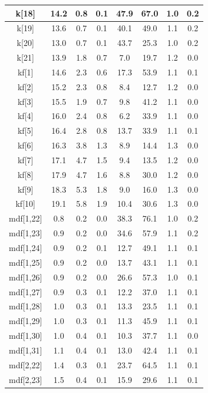 \begin{longtable}{|c|c|c|c|c|c|c|c|}
\hline
k[18] & 14.2 & 0.8 & 0.1 & 47.9 & 67.0 & 1.0 & 0.2 \\
\hline
k[19] & 13.6 & 0.7 & 0.1 & 40.1 & 49.0 & 1.1 & 0.2 \\
\hline
k[20] & 13.0 & 0.7 & 0.1 & 43.7 & 25.3 & 1.0 & 0.2 \\
\hline
k[21] & 13.9 & 1.8 & 0.7 & 7.0 & 19.7 & 1.2 & 0.0 \\
\hline
kf[1] & 14.6 & 2.3 & 0.6 & 17.3 & 53.9 & 1.1 & 0.1 \\
\hline
kf[2] & 15.2 & 2.3 & 0.8 & 8.4 & 12.7 & 1.2 & 0.0 \\
\hline
kf[3] & 15.5 & 1.9 & 0.7 & 9.8 & 41.2 & 1.1 & 0.0 \\
\hline
kf[4] & 16.0 & 2.4 & 0.8 & 6.2 & 33.9 & 1.1 & 0.0 \\
\hline
kf[5] & 16.4 & 2.8 & 0.8 & 13.7 & 33.9 & 1.1 & 0.1 \\
\hline
kf[6] & 16.3 & 3.8 & 1.3 & 8.9 & 14.4 & 1.3 & 0.0 \\
\hline
kf[7] & 17.1 & 4.7 & 1.5 & 9.4 & 13.5 & 1.2 & 0.0 \\
\hline
kf[8] & 17.9 & 4.7 & 1.6 & 8.8 & 30.0 & 1.2 & 0.0 \\
\hline
kf[9] & 18.3 & 5.3 & 1.8 & 9.0 & 16.0 & 1.3 & 0.0 \\
\hline
kf[10] & 19.1 & 5.8 & 1.9 & 10.4 & 30.6 & 1.3 & 0.0 \\
\hline
mdf[1,22] & 0.8 & 0.2 & 0.0 & 38.3 & 76.1 & 1.0 & 0.2 \\
\hline
mdf[1,23] & 0.9 & 0.2 & 0.0 & 34.6 & 57.9 & 1.1 & 0.2 \\
\hline
mdf[1,24] & 0.9 & 0.2 & 0.1 & 12.7 & 49.1 & 1.1 & 0.1 \\
\hline
mdf[1,25] & 0.9 & 0.2 & 0.0 & 13.7 & 43.1 & 1.1 & 0.1 \\
\hline
mdf[1,26] & 0.9 & 0.2 & 0.0 & 26.6 & 57.3 & 1.0 & 0.1 \\
\hline
mdf[1,27] & 0.9 & 0.3 & 0.1 & 12.2 & 37.0 & 1.1 & 0.1 \\
\hline
mdf[1,28] & 1.0 & 0.3 & 0.1 & 13.3 & 23.5 & 1.1 & 0.1 \\
\hline
mdf[1,29] & 1.0 & 0.3 & 0.1 & 11.3 & 45.9 & 1.1 & 0.1 \\
\hline
mdf[1,30] & 1.0 & 0.4 & 0.1 & 10.3 & 37.7 & 1.1 & 0.0 \\
\hline
mdf[1,31] & 1.1 & 0.4 & 0.1 & 13.0 & 42.4 & 1.1 & 0.1 \\
\hline
mdf[2,22] & 1.4 & 0.3 & 0.1 & 23.7 & 64.5 & 1.1 & 0.1 \\
\hline
mdf[2,23] & 1.5 & 0.4 & 0.1 & 15.9 & 29.6 & 1.1 & 0.1 \\

\end{longtable}
